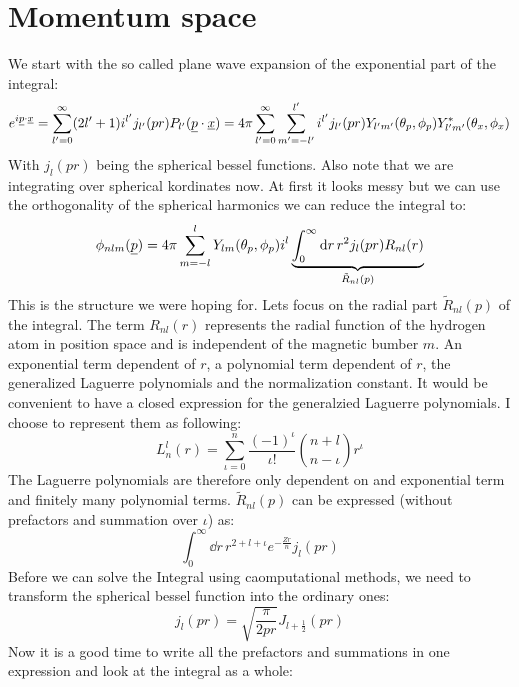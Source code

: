 \section*{Momentum space}
We start with the so called plane wave expansion \cite{Jackson:1998nia} of the exponential part of the integral:
\begin{equation*}
    e^{i\underline{p}\cdot\underline{x}} = \sum_{l'=0}^\infty (2l'+1)i^{l'} j_{l'}(pr) P_{l'}(\underline{p}\cdot\underline{x}) = 4\pi\sum_{l'=0}^\infty \sum_{m'=-l'}^{l'} i^{l'} j_{l'}(pr) Y_{l'm'}(\theta_p, \phi_p) Y_{l'm'}^*(\theta_x, \phi_x)
\end{equation*}
With $j_l(pr)$ being the spherical bessel functions. Also note that we are integrating over spherical kordinates now. At first it looks messy but we can use the orthogonality of the spherical harmonics we can reduce the integral to:
\begin{equation*}
    \phi_{nlm}(\underline{p}) = 4\pi \sum_{m=-l}^{l}Y_{lm}(\theta_p,\phi_p)i^l\underbrace{\int_{0}^{\infty}\mathrm{d} r\,r^2j_l(pr)R_{nl}(r)}_{\tilde{R}_{nl}(p)}
\end{equation*}
This is the structure we were hoping for. Lets focus on the radial part $\tilde{R}_{nl}(p)$ of the integral.
The term $R_{nl}(r)$ represents the radial function of the hydrogen atom in position space and is independent of the magnetic bumber $m$. 
An exponential term dependent of $r$, a polynomial term dependent of $r$, the generalized Laguerre polynomials and the normalization constant. 
It would be convenient to have a closed expression for the generalzied Laguerre polynomials. 
I choose to represent them as following:
\begin{equation*}
    L_n^l(r) = \sum_{\iota=0}^{n} \frac{(-1)^{\iota}}{\iota!}\binom{n+l}{n-\iota}r^{\iota}
\end{equation*}
The Laguerre polynomials are therefore only dependent on and exponential term and finitely many polynomial terms. 
$\tilde{R}_{nl}(p)$ can be expressed (without prefactors and summation over $\iota$) as:
\begin{equation*}
    \int_{0}^{\infty}\dd r\,r^{2+l+\iota} e^{-\frac{Zr}{n}} j_l(pr)
\end{equation*}
Before we can solve the Integral using caomputational methods, we need to transform the spherical bessel function into the ordinary ones:
\begin{equation*}
    j_l(pr) = \sqrt{\frac{\pi}{2pr}}J_{l+\frac{1}{2}}(pr)
\end{equation*}
Now it is a good time to write all the prefactors and summations in one expression and look at the integral as a whole:
